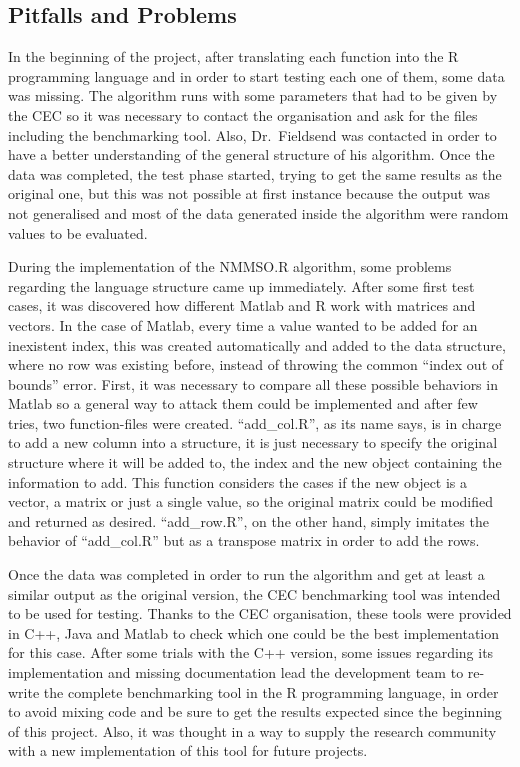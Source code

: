 \documentclass[12pt,a4paper]{article}
\begin{document}
\subsection{Pitfalls and Problems}\label{pitfalls-and-problems}

In the beginning of the project, after translating each function into
the R programming language and in order to start testing each one of
them, some data was missing. The algorithm runs with some parameters
that had to be given by the CEC so it was necessary to contact the
organisation and ask for the files including the benchmarking tool.
Also, Dr.~Fieldsend was contacted in order to have a better
understanding of the general structure of his algorithm. Once the data
was completed, the test phase started, trying to get the same results as
the original one, but this was not possible at first instance because
the output was not generalised and most of the data generated inside the
algorithm were random values to be evaluated.

During the implementation of the NMMSO.R algorithm, some problems
regarding the language structure came up immediately. After some first
test cases, it was discovered how different Matlab and R work with
matrices and vectors. In the case of Matlab, every time a value wanted
to be added for an inexistent index, this was created automatically and
added to the data structure, where no row was existing before, instead
of throwing the common ``index out of bounds'' error. First, it was
necessary to compare all these possible behaviors in Matlab so a general
way to attack them could be implemented and after few tries, two
function-files were created. ``add\_col.R'', as its name says, is in
charge to add a new column into a structure, it is just necessary to
specify the original structure where it will be added to, the index and
the new object containing the information to add. This function
considers the cases if the new object is a vector, a matrix or just a
single value, so the original matrix could be modified and returned as
desired. ``add\_row.R'', on the other hand, simply imitates the behavior
of ``add\_col.R'' but as a transpose matrix in order to add the rows.

Once the data was completed in order to run the algorithm and get at
least a similar output as the original version, the CEC benchmarking
tool was intended to be used for testing. Thanks to the CEC
organisation, these tools were provided in C++, Java and Matlab to check
which one could be the best implementation for this case. After some
trials with the C++ version, some issues regarding its implementation
and missing documentation lead the development team to re-write the
complete benchmarking tool in the R programming language, in order to
avoid mixing code and be sure to get the results expected since the
beginning of this project. Also, it was thought in a way to supply the
research community with a new implementation of this tool for future
projects.
\end{document}
